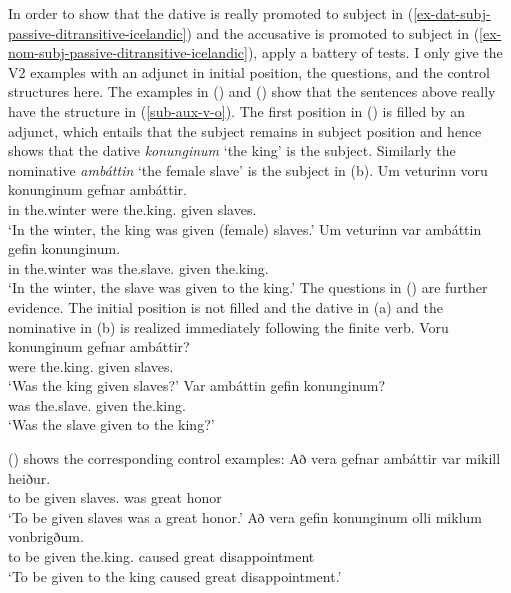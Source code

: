 In order to show that the dative is really promoted to subject in (\ref{ex-dat-subj-passive-ditransitive-icelandic}) and the accusative is
promoted to subject in (\ref{ex-nom-subj-passive-ditransitive-icelandic}), \citet*[]{ZMT85a} apply a battery of tests. I only give the
V2 examples with an adjunct in initial position, the questions, and the control structures here. The
examples in () and () show that the
sentences above really have the structure in (\ref{sub-aux-v-o}). The first position in () is
filled by an adjunct, which entails that the subject remains in subject position and hence shows
that the dative \emph{konunginum} `the king' is the subject. Similarly the nominative
\emph{ambáttin} `the female slave' is the subject in (b).
\eal
\ex
\gll Um veturinn voru konunginum gefnar ambáttir.\\
     in the.winter were the.king.\DAT{} given slaves.\NOM\\\icelandic
\glt `In the winter, the king was given (female) slaves.'
\ex
\gll Um veturinn var ambáttin gefin konunginum.\\
     in the.winter was the.slave.\NOM{} given the.king.\NOM\\
\glt `In the winter, the slave was given to the king.'
\zl
The questions in () are further evidence. The initial position is not filled and the dative
in (a) and the nominative in (b) is realized immediately following the finite verb.
\eal
\ex\label{ex-were-the-king-given-the-slaves}
\gll Voru konunginum gefnar ambáttir?\\
     were the.king.\DAT{} given slaves.\NOM{}\\\icelandic
\glt `Was the king given slaves?'
\ex\label{ex-were-the-slaves-given-the-king}
\gll Var ambáttin gefin konunginum?\\
     was the.slave.\NOM{} given the.king.\DAT\\
\glt `Was the slave given to the king?'
\zl

() shows the corresponding control examples:
\eal
\ex
\gll Að vera gefnar ambáttir var mikill heiður.\\
     to be given slaves.\NOM{} was great honor\\\icelandic
\glt `To be given slaves was a great honor.'
\ex
\gll Að vera gefin konunginum olli miklum vonbrigðum.\\
     to be given the.king.\DAT{} caused great disappointment\\
\glt `To be given to the king caused great disappointment.'

